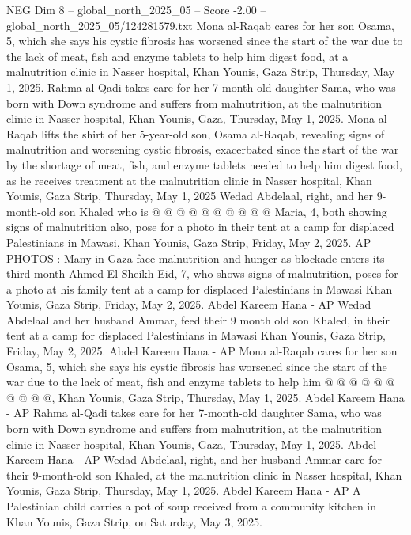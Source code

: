\begin{textsample}{NEG Dim 8 – global\_north\_2025\_05 – Score -2.00 – global\_north\_2025\_05/124281579.txt}  \label{ex:f8_neg_057}
Mona al-Raqab cares for her son Osama, 5, which she says his cystic fibrosis has worsened since the start of the war due to the lack of meat, fish and enzyme tablets to help him digest food, at a malnutrition clinic in Nasser hospital, Khan Younis, Gaza Strip, Thursday, May 1, 2025.
Rahma al-Qadi takes care for her 7-month-old daughter Sama, who was born with Down syndrome and suffers from malnutrition, at the malnutrition clinic in Nasser hospital, Khan Younis, Gaza, Thursday, May 1, 2025.
Mona al-Raqab lifts the shirt of her 5-year-old son, Osama al-Raqab, revealing signs of malnutrition and worsening cystic fibrosis, exacerbated since the start of the war by the shortage of meat, fish, and enzyme tablets needed to help him digest food, as he receives treatment at the malnutrition clinic in Nasser hospital, Khan Younis, Gaza Strip, Thursday, May 1, 2025 Wedad Abdelaal, right, and her 9-month-old son Khaled who is @ @ @ @ @ @ @ @ @ @ Maria, 4, both showing signs of malnutrition also, pose for a photo in their tent at a camp for displaced Palestinians in Mawasi, Khan Younis, Gaza Strip, Friday, May 2, 2025.
AP PHOTOS : Many in Gaza face malnutrition and hunger as blockade enters its third month Ahmed El-Sheikh Eid, 7, who shows signs of malnutrition, poses for a photo at his family tent at a camp for displaced Palestinians in Mawasi Khan Younis, Gaza Strip, Friday, May 2, 2025.
Abdel Kareem Hana - AP Wedad Abdelaal and her husband Ammar, feed their 9 month old son Khaled, in their tent at a camp for displaced Palestinians in Mawasi Khan Younis, Gaza Strip, Friday, May 2, 2025.
Abdel Kareem Hana - AP Mona al-Raqab cares for her son Osama, 5, which she says his cystic fibrosis has worsened since the start of the war due to the lack of meat, fish and enzyme tablets to help him @ @ @ @ @ @ @ @ @ @, Khan Younis, Gaza Strip, Thursday, May 1, 2025.
Abdel Kareem Hana - AP Rahma al-Qadi takes care for her 7-month-old daughter Sama, who was born with Down syndrome and suffers from malnutrition, at the malnutrition clinic in Nasser hospital, Khan Younis, Gaza, Thursday, May 1, 2025.
Abdel Kareem Hana - AP Wedad Abdelaal, right, and her husband Ammar care for their 9-month-old son Khaled, at the malnutrition clinic in Nasser hospital, Khan Younis, Gaza Strip, Thursday, May 1, 2025.
Abdel Kareem Hana - AP A Palestinian child carries a pot of soup received from a community kitchen in Khan Younis, Gaza Strip, on Saturday, May 3, 2025.

\end{textsample}
